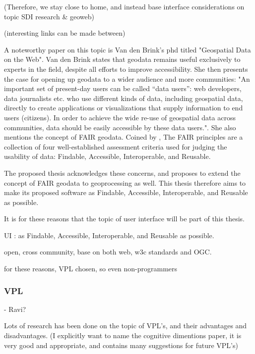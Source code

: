 (Therefore, we stay close to home, and instead base interface considerations on topic SDI research \& geoweb)

(interesting links can be made between)

A noteworthy paper on this topic is Van den Brink's phd titled "Geospatial Data on the Web". Van den Brink states that geodata remains useful exclusively to experts in the field, despite all efforts to improve accessibility. 
She then presents the case for opening up geodata to a wider audience and more communities: "An important set of present-day users can be called “data users”: web developers, data journalists etc. who use different kinds of data, including geospatial data, directly to create applications or visualizations that supply information to end users (citizens). In order to achieve the wide re-use of geospatial data across communities, data should be easily accessible by these data users.". She also mentions the concept of FAIR geodata. Coined by \cite{mark_d_wilkinson_fair_2016}, The FAIR principles are a collection of four well-established assessment criteria used for judging the usability of data: Findable, Accessible, Interoperable, and Reusable. 

The proposed thesis acknowledges these concerns, and proposes to extend the concept of FAIR geodata to geoprocessing as well. This thesis therefore aims to make its proposed software as Findable, Accessible, Interoperable, and Reusable as possible. 

It is for these reasons that the topic of user interface will be part of this thesis. 

UI : as Findable, Accessible, Interoperable, and Reusable as possible. 

open, cross community, base on both web, w3c standards and OGC.

for these reasons, VPL chosen, so even non-programmers



\subsubsection*{VPL}

- Ravi?

Lots of research has been done on the topic of VPL's, and their advantages and disadvantages. 
(I explicitly want to name the cognitive dimentions paper, it is very good and appropriate, and contains many suggestions for future VPL's)




